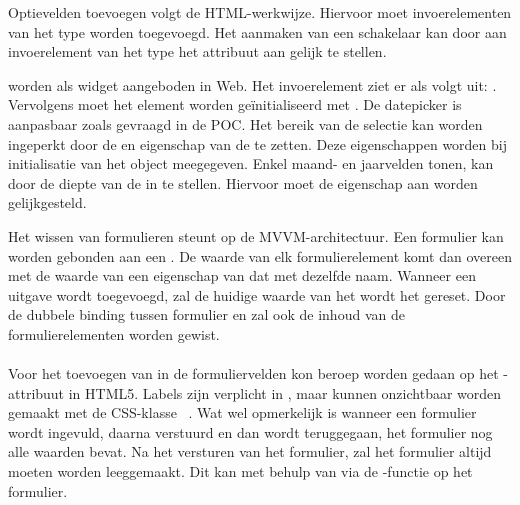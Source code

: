  Optievelden toevoegen volgt de HTML-werkwijze.
 Hiervoor moet invoerelementen van het type  worden toegevoegd.
 Het aanmaken van een schakelaar kan door aan invoerelement van het type  het  attribuut aan  gelijk te stellen.

  worden als widget aangeboden in \kendo Web.
 Het invoerelement ziet er als volgt uit: .  
 Vervolgens moet het element worden geïnitialiseerd met .
 De datepicker is aanpasbaar zoals gevraagd in de POC.
 Het bereik van de selectie kan worden ingeperkt door de  en  eigenschap van de  te zetten.
 Deze eigenschappen worden bij initialisatie van het object meegegeven.
 Enkel maand- en jaarvelden tonen, kan door de diepte van de  in te stellen.
 Hiervoor moet de eigenschap  aan  worden gelijkgesteld.
 
 Het wissen van formulieren steunt op de MVVM-architectuur.
 Een formulier kan worden gebonden aan een .
 De waarde van elk formulierelement komt dan overeen met de waarde van een eigenschap van dat  met dezelfde naam.
 Wanneer een uitgave wordt toegevoegd, zal de huidige waarde van het  wordt het  gereset.
 Door de dubbele binding tussen formulier en  zal ook de inhoud van de formulierelementen worden gewist.
 
\paragraph{\jqm} 
Voor het toevoegen van  in de formuliervelden kon beroep worden gedaan op het -attribuut in HTML5. 
Labels zijn verplicht in \jqm{}, maar kunnen onzichtbaar worden gemaakt met de CSS-klasse ~\cite{JQuery2013}. 
Wat wel opmerkelijk is wanneer een formulier wordt ingevuld, daarna verstuurd en dan wordt teruggegaan, het formulier nog alle waarden bevat. 
Na het versturen van het formulier, zal het formulier altijd moeten worden leeggemaakt. 
Dit kan met behulp van \js{} via de -functie op het formulier.
 
